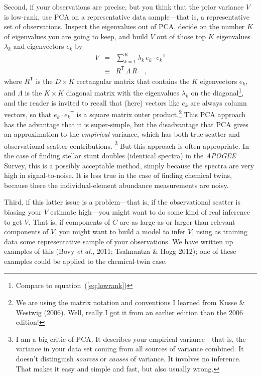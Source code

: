 \documentclass[12pt,letterpaper]{article}
\newcommand{\foreign}[1]{\textsl{#1}}
\newcommand{\project}[1]{\textsl{#1}}
\newcommand{\acronym}[1]{{\small{#1}}}
\newcommand{\equationname}{equation}
\newcommand{\etal}{\foreign{et al.}}
\newcommand{\tra}[1]{{#1}^{\mathsf{T}}}
\begin{document}
Second, if your observations are precise, but you think that the prior
variance $V$ is low-rank, use \acronym{PCA} on a representative data
sample---that is, a representative set of observations. Inspect the
eigenvalues out of \acronym{PCA}, decide on the number $K$ of eigenvalues
you are going to keep, and build
$V$ out of those top $K$ eigenvalues $\lambda_k$ and eigenvectors $e_k$ by
\begin{eqnarray}
  V &=& \sum_{k=1}^K \lambda_k\,e_k\cdot\tra{e_k}
\\
    &\equiv& \tra{R}\,\Lambda\,R
\quad ,
\end{eqnarray}
where $\tra{R}$ is the $D\times K$ rectangular matrix that contains
the $K$ eigenvectors $e_k$, and $\Lambda$ is the $K\times K$ diagonal matrix
with the eigenvalues $\lambda_k$ on the diagonal\footnote{%
  Compare to \equationname~(\ref{eq:lowrank})},
and the reader is invited to recall
that (here) vectors like $e_k$ are always column vectors, so that
$e_k\cdot\tra{e_k}$ is a square matrix outer product.\footnote{We
  are using the matrix notation and conventions I learned from Kusse
  \& Westwig (2006). Well, really I got it from an earlier edition than the 2006 edition!}
This \acronym{PCA} approach
has the advantage that it is super-simple, but the disadvantage
that \acronym{PCA} gives an approximation to the \emph{empirical} variance, which
has both true-scatter and observational-scatter contributions.%
\footnote{I am a big critic of \acronym{PCA}. It describes your
  empirical variance---that is, the variance in your data set coming
  from all sources of variance combined. It doesn't distinguish
  \emph{sources} or \emph{causes} of variance. It involves no
  inference. That makes it easy and simple and fast, but also usually
  wrong.}
But this approach is often
appropriate. In the case of finding stellar stunt doubles (identical
spectra) in the \project{\acronym{APOGEE}} Survey, this is a possibly acceptable
method, simply because the spectra are very high in
signal-to-noise. It is less true in the case of finding chemical
twins, because there the individual-element abundance measurements are
noisy.

Third, if this latter issue is a problem---that is, if the
observational scatter is biasing your $V$ estimate high---you might
want to do some kind of real inference to get $V$. That is, if
components of $C$ are as large as or larger than relevant components
of $V$, you might want to build a model to infer $V$, using as
training data some representative sample of your observations. We have
written up examples of this (Bovy \etal, 2011; Tsalmantza \& Hogg 2012);
one of these examples could be applied to the chemical-twin case.
\end{document}
